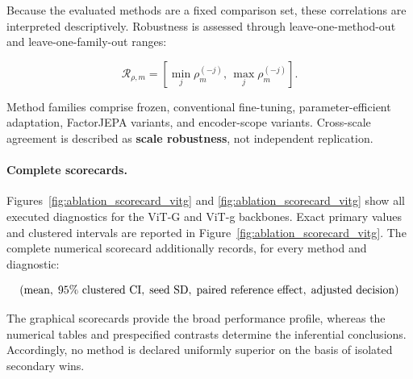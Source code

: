 Because the evaluated methods are a fixed comparison set, these
correlations are interpreted descriptively. Robustness is assessed
through leave-one-method-out and leave-one-family-out ranges:

\begin{equation*}
\mathcal R_{\rho,m}
=
\left[
\min_j \rho_m^{(-j)},
\,
\max_j \rho_m^{(-j)}
\right].
\end{equation*}

Method families comprise frozen, conventional fine-tuning,
parameter-efficient adaptation, FactorJEPA variants, and encoder-scope
variants. Cross-scale agreement is described as
\textbf{scale robustness}, not independent replication.

\paragraph{Complete scorecards.}
Figures~\ref{fig:ablation_scorecard_vitg} and
\ref{fig:ablation_scorecard_vitg} show all executed diagnostics for
the ViT-G and ViT-g backbones. Exact primary values and clustered
intervals are reported in
Figure~\ref{fig:ablation_scorecard_vitg}. The complete numerical
scorecard additionally records, for every method and diagnostic:

\begin{equation*}
\resizebox{0.98\columnwidth}{!}{$\displaystyle
\left(
\text{mean},
\;
95\%\ \mathrm{clustered\ CI},
\;
\text{seed SD},
\;
\text{paired reference effect},
\;
\text{adjusted decision}
\right)
$}
\end{equation*}

The graphical scorecards provide the broad performance profile, whereas
the numerical tables and prespecified contrasts determine the
inferential conclusions. Accordingly, no method is declared uniformly
superior on the basis of isolated secondary wins.














































